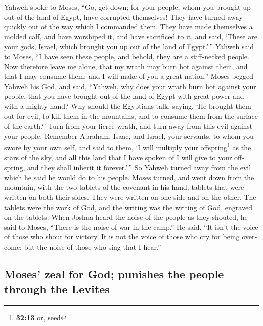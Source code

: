 \begin{paracol}{2}
\begin{otherlanguage}{english}
 Yahweh spoke to Moses, ``Go, get down; for your people,
whom you brought up out of the land of Egypt, have corrupted themselves!
 They have turned away quickly out of the way which I
commanded them. They have made themselves a molded calf, and have
worshiped it, and have sacrificed to it, and said, `These are your gods,
Israel, which brought you up out of the land of Egypt.'\,''
 Yahweh said to Moses, ``I have seen these people, and
behold, they are a stiff-necked people.  Now therefore
leave me alone, that my wrath may burn hot against them, and that I may
consume them; and I will make of you a great nation.'' 
Moses begged Yahweh his God, and said, ``Yahweh, why does your wrath
burn hot against your people, that you have brought out of the land of
Egypt with great power and with a mighty hand?  Why
should the Egyptians talk, saying, `He brought them out for evil, to
kill them in the mountains, and to consume them from the surface of the
earth?' Turn from your fierce wrath, and turn away from this evil
against your people.  Remember Abraham, Isaac, and
Israel, your servants, to whom you swore by your own self, and said to
them, `I will multiply your offspring\footnote{\textbf{32:13} or, seed}
as the stars of the sky, and all this land that I have spoken of I will
give to your offspring, and they shall inherit it forever.'\,''
 So Yahweh turned away from the evil which he said he
would do to his people.  Moses turned, and went down from
the mountain, with the two tablets of the covenant in his hand; tablets
that were written on both their sides. They were written on one side and
on the other.  The tablets were the work of God, and the
writing was the writing of God, engraved on the tablets. 
When Joshua heard the noise of the people as they shouted, he said to
Moses, ``There is the noise of war in the camp.''  He
said, ``It isn't the voice of those who shout for victory. It is not the
voice of those who cry for being overcome; but the noise of those who
sing that I hear.''

\hypertarget{moses-zeal-for-god-punishes-the-people-through-the-levites}{%
\subsection{Moses' zeal for God; punishes the people through the
Levites}\label{moses-zeal-for-god-punishes-the-people-through-the-levites}}


\end{otherlanguage}
\end{paracol}
